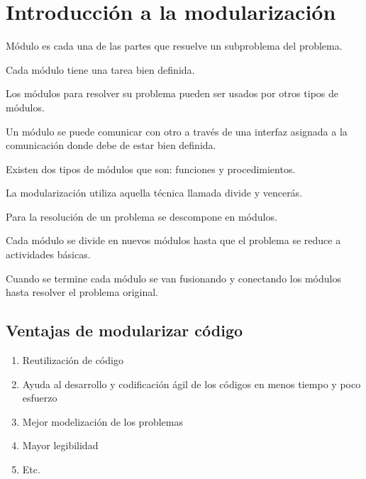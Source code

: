 \chapter[Modularización]{Introducción a la modularización}
\raggedright
Módulo es cada una de las partes que resuelve un subproblema del problema.

\vspace{1em}
Cada módulo tiene una tarea bien definida.

\vspace{1em}
Los módulos para resolver su problema pueden ser usados por otros tipos de módulos.

\vspace{1em}
Un módulo se puede comunicar con otro a través de una interfaz asignada a la comunicación donde debe de estar bien definida.

\vspace{1em}
Existen dos tipos de módulos que son: funciones y procedimientos.

\vspace{1em}
La modularización utiliza aquella técnica llamada divide y vencerás.

\vspace{1em}
Para la resolución de un problema se descompone en módulos.

\vspace{1em}
Cada módulo se divide en nuevos módulos hasta que el problema se reduce a actividades básicas.

\vspace{1em}
Cuando se termine cada módulo se van fusionando y conectando los módulos hasta resolver el problema original.

\section[Ventajas]{Ventajas de modularizar código}

\begin{enumerate}
	\item Reutilización de código
	\item Ayuda al desarrollo y codificación ágil de los códigos en menos tiempo y poco esfuerzo
	\item Mejor modelización de los problemas
	\item Mayor legibilidad
	\item Etc.
\end{enumerate}